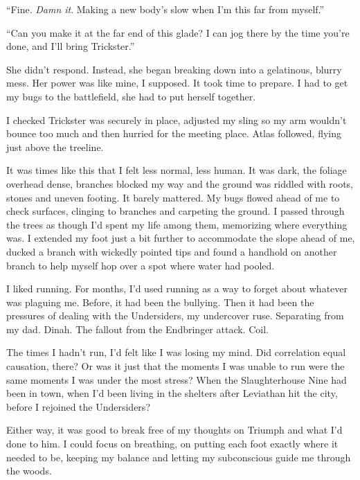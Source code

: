 ``Fine.  \emph{Damn it}.  Making a new body's slow when I'm this far from myself.''



``Can you make it at the far end of this glade?  I can jog there by the time you're done, and I'll bring Trickster.''



She didn't respond.  Instead, she began breaking down into a gelatinous, blurry mess.  Her power was like mine, I supposed.  It took time to prepare.  I had to get my bugs to the battlefield, she had to put herself together.



I checked Trickster was securely in place, adjusted my sling so my arm wouldn't bounce too much and then hurried for the meeting place.  Atlas followed, flying just above the treeline.



It was times like this that I felt less normal, less human.  It was dark, the foliage overhead dense, branches blocked my way and the ground was riddled with roots, stones and uneven footing.  It barely mattered.  My bugs flowed ahead of me to check surfaces, clinging to branches and carpeting the ground.  I passed through the trees as though I'd spent my life among them, memorizing where everything was.  I extended my foot just a bit further to accommodate the slope ahead of me, ducked a branch with wickedly pointed tips and found a handhold on another branch to help myself hop over a spot where water had pooled.



I liked running.  For months, I'd used running as a way to forget about whatever was plaguing me.  Before, it had been the bullying.  Then it had been the pressures of dealing with the Undersiders, my undercover ruse.  Separating from my dad.  Dinah.  The fallout from the Endbringer attack.  Coil.



The times I hadn't run, I'd felt like I was losing my mind.  Did correlation equal causation, there?  Or was it just that the moments I was unable to run were the same moments I was  under the most stress?  When the Slaughterhouse Nine had been in town, when I'd been living in the shelters after Leviathan hit the city, before I rejoined the Undersiders?



Either way, it was good to break free of my thoughts on Triumph and what I'd done to him. I could focus on breathing, on putting each foot exactly where it needed to be, keeping my balance and letting my subconscious guide me through the woods.



